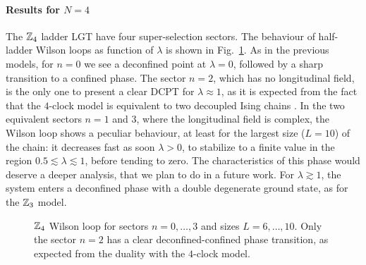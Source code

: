 \paragraph{Results for \texorpdfstring{$N=4$}{N=4}}%
The $\mathbb{Z}_4$ ladder LGT have four super-selection sectors.
The behaviour of half-ladder Wilson loops as function of $\lambda$ is shown in Fig.~\ref{fig:z4_wilson}.
As in the previous models, for $n=0$ we see a deconfined point at $\lambda = 0$, followed by a sharp transition to a confined phase.
The sector $n=2$, which has no longitudinal field, is the only one to present a clear DCPT for $\lambda \approx 1$, as it is expected from the fact that the $4$-clock model is equivalent to two decoupled Ising chains \cite{ortiz2012dualities}.
In the two equivalent sectors $n=1$ and $3$, where the longitudinal field is complex, the Wilson loop shows a peculiar behaviour, at least for the largest size ($L=10$) of the chain: it decreases fast as soon $\lambda > 0$, to stabilize to a finite value in the region $0.5 \lesssim \lambda \lesssim 1$, before tending to zero.
The characteristics of this phase would deserve a deeper analysis, that we plan to do in a future work.
For $\lambda \gtrsim 1$, the system enters a deconfined phase with a double degenerate ground state, as for the $\mathbb{Z}_3$ model.


\begin{figure}[t]
    \centering
    
    \vspace*{-10pt}
    \caption{$\mathbb{Z}_4$ Wilson loop for sectors $n=0, \dots, 3$ and sizes $L=6, \dots, 10$.
        Only the sector $n = 2$ has a clear deconfined-confined phase transition, as expected from the duality with the $4$-clock model.
    }
    \label{fig:z4_wilson}
\end{figure}

\smallskip

%

